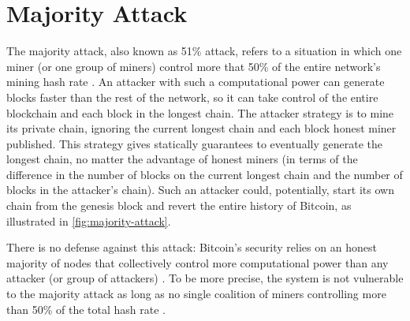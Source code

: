 \section{Majority Attack}
The majority attack, also known as \num{51}\% attack, refers to a situation in which one miner (or one group of miners) control more that \num{50}\% of the entire network's mining hash rate \cite{majority_investopedia, majority_bitcoin_wiki}.
An attacker with such a computational power can generate blocks faster than the rest of the network, so it can take control of the entire blockchain and each block in the longest chain.
The attacker strategy is to mine its private chain, ignoring the current longest chain and each block honest miner published.
This strategy gives statically guarantees to eventually generate the longest chain, no matter the advantage of honest miners (in terms of the difference in the number of blocks on the current longest chain and the number of blocks in the attacker's chain).
Such an attacker could, potentially, start its own chain from the genesis block and revert the entire history of Bitcoin, as illustrated in \cref{fig:majority-attack}.

There is no defense against this attack:
Bitcoin's security relies on an honest majority of nodes that collectively control more computational power than any attacker (or group of attackers) \cite{bitcoin_2009}.
To be more precise, the system is not vulnerable to the majority attack as long as no single coalition of miners controlling more than \num{50}\% of the total hash rate \cite{bitcoin_wiki_irreversible_transactions}.

